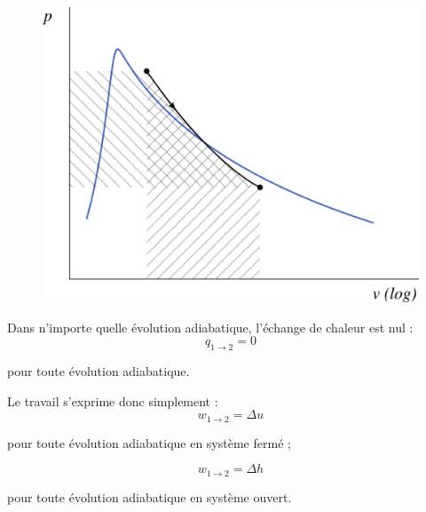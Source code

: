 		\begin{figure}
			\begin{center}
				\includegraphics[width=\pvdiagramwidth]{images/pv_lv_isentropique.png}
			\end{center}
			\label{fig_pv_lv_isentropique}
		\end{figure}

		
		Dans n’importe quelle évolution adiabatique, l’échange de chaleur est nul :
		\begin{equation}
			q_{1\to2} = 0
			\label{eq_lv_travail_adiabatique}
		\end{equation}
		\begin{equationterms}
			\item pour toute évolution adiabatique.
		\end{equationterms}

		Le travail s’exprime donc simplement :
		\begin{equation}
			w_{1\to2} = \Delta u
			\label{eq_lv_travail_adiabatique_sf}
		\end{equation}
		\begin{equationterms}
			\item pour toute évolution adiabatique en système fermé ;
		\end{equationterms}
		\begin{equation}
			w_{1\to2} = \Delta h
			\label{eq_lv_travail_adiabatique_so}
		\end{equation}
		\begin{equationterms}
			\item pour toute évolution adiabatique en système ouvert.
		\end{equationterms}


